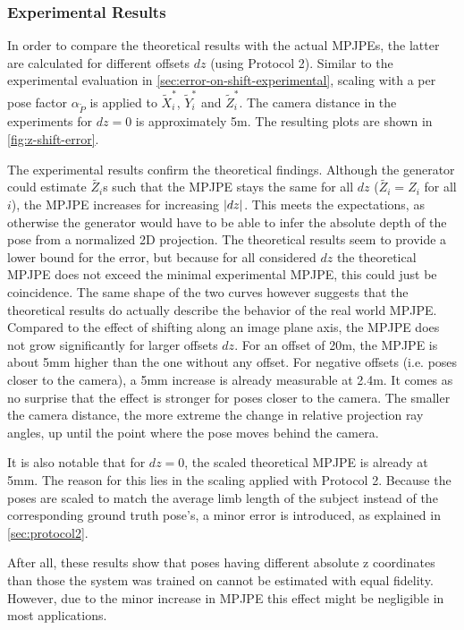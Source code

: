 \subsubsection{Experimental Results}
\label{sec:error-on-shift-experimental}



In order to compare the theoretical results with the actual MPJPEs, the latter are calculated for different offsets $dz$ (using Protocol 2).
Similar to the experimental evaluation in \autoref{sec:error-on-shift-experimental}, scaling with a per pose factor $\alpha_{\widetilde{P}}$ is applied to $\widetilde{X}_i^\ast$, $\widetilde{Y}_i^\ast$ and $\widetilde{Z}_i^\ast$.
The camera distance in the experiments for $dz = 0$ is approximately 5m.
The resulting plots are shown in \autoref{fig:z-shift-error}.

The experimental results confirm the theoretical findings.
Although the generator could estimate $\widetilde{Z_i}$s such that the MPJPE stays the same for all $dz$ ($\widetilde{Z_i} = Z_i$ for all $i$), the MPJPE increases for increasing $\abs{dz}$.
This meets the expectations, as otherwise the generator would have to be able to infer the absolute depth of the pose from a normalized 2D projection.
The theoretical results seem to provide a lower bound for the error, but because for all considered $dz$ the theoretical MPJPE does not exceed the minimal experimental MPJPE, this could just be coincidence.
The same shape of the two curves however suggests that the theoretical results do actually describe the behavior of the real world MPJPE.
Compared to the effect of shifting along an image plane axis, the MPJPE does not grow significantly for larger offsets $dz$.
For an offset of 20m, the MPJPE is about 5mm higher than the one without any offset.
For negative offsets (i.e. poses closer to the camera), a 5mm increase is already measurable at 2.4m.
It comes as no surprise that the effect is stronger for poses closer to the camera.
The smaller the camera distance, the more extreme the change in relative projection ray angles, up until the point where the pose moves behind the camera.

It is also notable that for $dz = 0$, the scaled theoretical MPJPE is already at 5mm.
The reason for this lies in the scaling applied with Protocol 2.
Because the poses are scaled to match the average limb length of the subject instead of the corresponding ground truth pose's, a minor error is introduced, as explained in \autoref{sec:protocol2}.

After all, these results show that poses having different absolute z coordinates than those the system was trained on cannot be estimated with equal fidelity.
However, due to the minor increase in MPJPE this effect might be negligible in most applications.